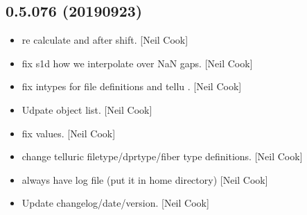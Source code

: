 \documentclass[a4paper,10pt,english]{report}
\begin{document}
\subsection{0.5.076 (2019\sphinxhyphen{}09\sphinxhyphen{}23)}
\label{\detokenize{misc/changelog:id85}}\begin{itemize}
\item {} 
 \sphinxhyphen{} re calculate  and 
after shift. {[}Neil Cook{]}

\item {} 
 \sphinxhyphen{} fix s1d how we interpolate over NaN gaps.
{[}Neil Cook{]}

\item {} 
 \sphinxhyphen{}
fix intypes for file definitions and tellu . {[}Neil Cook{]}

\item {} 
Udpate object list. {[}Neil Cook{]}

\item {} 
 \sphinxhyphen{} fix
 values. {[}Neil Cook{]}

\item {} 
 \sphinxhyphen{} change telluric
filetype/dprtype/fiber type definitions. {[}Neil Cook{]}

\item {} 
 \sphinxhyphen{} always have log file (put it in home directory)
{[}Neil Cook{]}

\item {} 
Update changelog/date/version. {[}Neil Cook{]}

\end{itemize}
\end{document}
